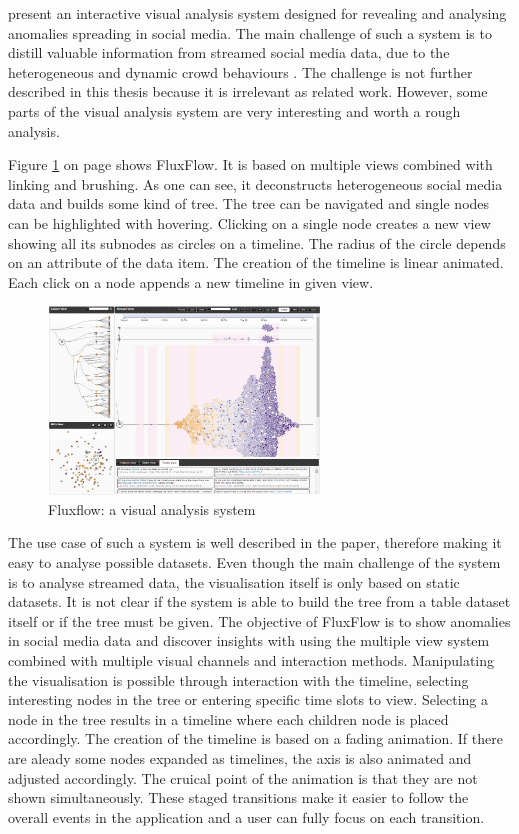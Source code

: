 \citeauthor{Zhao2014} present an interactive visual analysis system designed for revealing and analysing anomalies spreading in social media. The main challenge of such a system is to distill valuable information from streamed social media data, due to the heterogeneous and dynamic crowd behaviours . The challenge is not further described in this thesis because it is irrelevant as related work. However, some parts of the visual analysis system are very interesting and worth a rough analysis.

Figure \ref{fig:fluxflow} on page \pageref{fig:fluxflow} shows FluxFlow. It is based on multiple views combined with linking and brushing. As one can see, it deconstructs heterogeneous social media data and builds some kind of tree. The tree can be navigated and single nodes can be highlighted with hovering. Clicking on a single node creates a new view showing all its subnodes as circles on a timeline. The radius of the circle depends on an attribute of the data item. The creation of the timeline is linear animated. Each click on a node appends a new timeline in given view.

\begin{figure}[!htb]
\centering
\includegraphics[height=5cm]{images/methods/related/fluxflow.png}
\caption[
    Fluxflow: a visual analysis system .
]{Fluxflow: a visual analysis system}
\label{fig:fluxflow}
\end{figure}

The use case of such a system is well described in the paper, therefore making it easy to analyse possible datasets. Even though the main challenge of the system is to analyse streamed data, the visualisation itself is only based on static datasets. It is not clear if the system is able to build the tree from a table dataset itself or if the tree must be given.
The objective of FluxFlow is to show anomalies in social media data and discover insights with using the multiple view system combined with multiple visual channels and interaction methods. Manipulating the visualisation is possible through interaction with the timeline, selecting interesting nodes in the tree or entering specific time slots to view. Selecting a node in the tree results in a timeline where each children node is placed accordingly. The creation of the timeline is based on a fading animation. If there are aleady some nodes expanded as timelines, the axis is also animated and adjusted accordingly. The cruical point of the animation is that they are not shown simultaneously. These staged transitions make it easier to follow the overall events in the application and a user can fully focus on each transition.